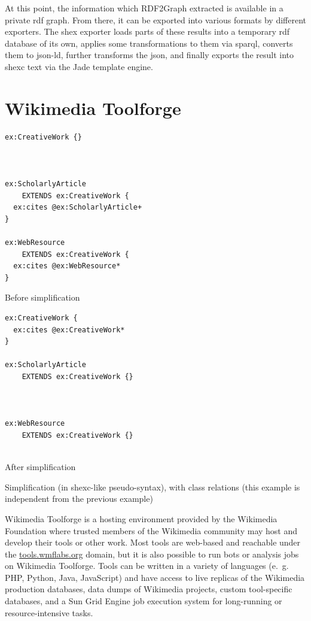 At this point, the information which \gls{RDF2Graph} extracted is available in a private \gls{rdf} graph.
From there, it can be exported into various formats by different exporters.
The \gls{shex} exporter loads parts of these results into a temporary \gls{rdf} database of its own,
applies some transformations to them via \gls{sparql},
converts them to \gls{json-ld},
further transforms the \gls{json},
and finally exports the result into \gls{shexc} text via the Jade template engine.

\section{Wikimedia Toolforge}
\label{sec:Background:Toolforge}

\begin{listing}[t]
\begin{sublisting}[t]{0.45\textwidth}
\begin{lstlisting}
ex:CreativeWork {}



ex:ScholarlyArticle
    EXTENDS ex:CreativeWork {
  ex:cites @ex:ScholarlyArticle+
}

ex:WebResource
    EXTENDS ex:CreativeWork {
  ex:cites @ex:WebResource*
}
\end{lstlisting}
\caption{Before simplification}
\label{fig:simplify-classes-before}
\end{sublisting}
\begin{sublisting}[t]{0.45\textwidth}
\begin{lstlisting}[showlines=true]
ex:CreativeWork {
  ex:cites @ex:CreativeWork*
}

ex:ScholarlyArticle
    EXTENDS ex:CreativeWork {}



ex:WebResource
    EXTENDS ex:CreativeWork {}


\end{lstlisting}
\caption{After simplification}
\label{fig:simplify-classes-after}
\end{sublisting}
\caption[Simplification, with class relations]{
  Simplification (in \acrshort{shexc}-like pseudo-syntax), with class relations
  (this example is independent from the previous example)
}
\label{fig:simplify-classes}
\end{listing}

\gls{Wikimedia Toolforge} is a hosting environment provided by the \gls{Wikimedia Foundation}
where trusted members of the \gls{Wikimedia} community may host and develop their tools or other work.
Most tools are web-based and reachable under the \href{https://tools.wmflabs.org/}{tools.wmflabs.org} domain,
but it is also possible to run bots or analysis jobs on \gls{Wikimedia Toolforge}.
Tools can be written in a variety of languages
(e.~g. PHP, Python, \gls{Java}, \gls{JavaScript})
and have access to live replicas of the \gls{Wikimedia} production databases,
data dumps of \gls{Wikimedia} projects,
custom tool-specific databases,
and a Sun Grid Engine job execution system for long-running or resource-intensive tasks.
